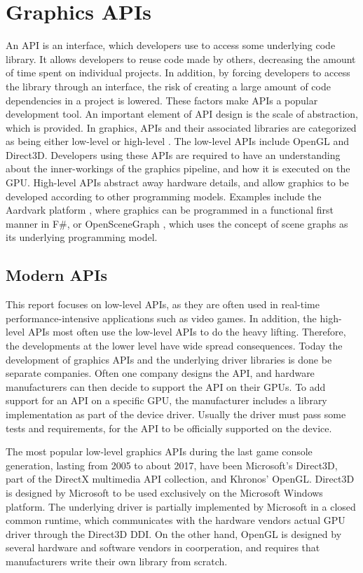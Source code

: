 \section{Graphics APIs}\label{sec:graphics_apis}
An \gls{API} is an interface, which developers use to access some underlying code library.
It allows developers to reuse code made by others, decreasing the amount of time spent on individual projects.
In addition, by forcing developers to access the library through an interface, the risk of creating a large amount of code dependencies in a project is lowered.
These factors make \glspl{API} a popular development tool. 
An important element of \gls{API} design is the scale of abstraction, which is provided.
In graphics, \glspl{API} and their associated libraries are categorized as being either low-level or high-level \cite{wikiGraphicsLibs}.
The low-level \glspl{API} include OpenGL and Direct3D. Developers using these \glspl{API} are required to have an understanding about the inner-workings of the graphics pipeline, and how it is executed on the \gls{GPU}.
High-level \glspl{API} abstract away hardware details, and allow graphics to be developed according to other programming models.
Examples include the Aardvark platform \cite{aardvark}, where graphics can be programmed in a functional first manner in F\#, or OpenSceneGraph \cite{openSceneGraph}, which uses the concept of scene graphs as its underlying programming model. 

\subsection{Modern APIs}
This report focuses on low-level \glspl{API}, as they are often used in real-time performance-intensive applications such as video games.
In addition, the high-level \glspl{API} most often use the low-level \glspl{API} to do the heavy lifting.
Therefore, the developments at the lower level have wide spread consequences.
Today the development of graphics \glspl{API} and the underlying driver libraries is done be separate companies.
Often one company designs the \gls{API}, and hardware manufacturers can then decide to support the \gls{API} on their \glspl{GPU}.
To add support for an \gls{API} on a specific \gls{GPU}, the manufacturer includes a library implementation as part of the device driver.
Usually the driver must pass some tests and requirements, for the \gls{API} to be officially supported on the device.   

The most popular low-level graphics \glspl{API} during the last game console generation, lasting from 2005 to about 2017, have been Microsoft’s Direct3D, part of the DirectX multimedia API collection, and Khronos’ OpenGL. 
Direct3D is designed by Microsoft to be used exclusively on the Microsoft Windows platform. 
The underlying driver is partially implemented by Microsoft in a closed common runtime, which communicates with the hardware vendors actual \gls{GPU} driver through the Direct3D \gls{DDI}\cite{dxDDI}.
On the other hand, OpenGL is designed by several hardware and software vendors in coorperation, and requires that manufacturers write their own library from scratch. 

